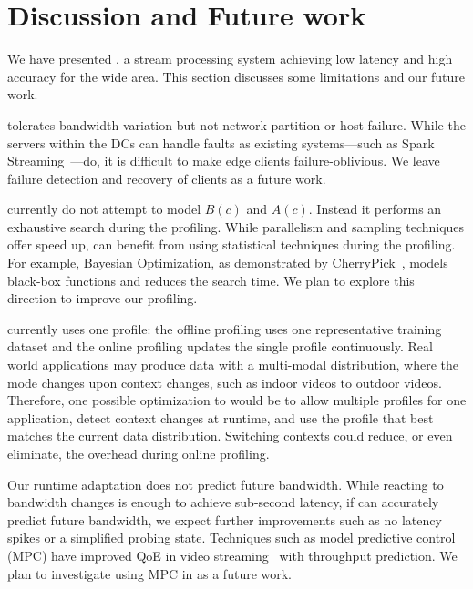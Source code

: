 \section{Discussion and Future work}
\label{sec:discussion}

We have presented \sysname{}, a stream processing system achieving low latency
and high accuracy for the wide area. This section discusses some limitations and
our future work.

 \sysname{} tolerates bandwidth
variation but not network partition or host failure. While the servers within
the DCs can handle faults as existing systems---such as Spark
Streaming~\cite{zaharia2013discretized}---do, it is difficult to make edge clients failure-oblivious.
We leave failure detection and recovery of clients as a future work.

 \sysname{} currently do not attempt to model $B(c)$
and $A(c)$. Instead it performs an exhaustive search during the profiling. While
parallelism and sampling techniques offer speed up, \sysname{} can benefit from
using statistical techniques during the profiling. For example, Bayesian
Optimization, as demonstrated by CherryPick~\cite{alipourfard2017cherrypick},
models black-box functions and reduces the search time. We plan to explore this
direction to improve our profiling.


 \sysname{} currently uses one profile:
the offline profiling uses one representative training dataset and the online profiling updates the single profile continuously. Real world applications may produce data with a multi-modal
distribution, where the mode changes upon context changes, such as indoor videos
to outdoor videos. Therefore, one possible optimization to \sysname{} would be to allow multiple profiles
for one application, detect context changes at runtime, and use the profile that
best matches the current data distribution.
Switching contexts could reduce, or even eliminate, the overhead during online profiling.

 Our runtime adaptation does not
predict future bandwidth. While reacting to bandwidth changes is enough to
achieve sub-second latency, if \sysname{} can accurately predict future
bandwidth, we expect further improvements such as no latency spikes or a
simplified probing state. Techniques such as model predictive control (MPC) have
improved QoE in video streaming~\cite{yin2015control} with throughput
prediction. We plan to investigate using MPC in \sysname{} as a future work.

